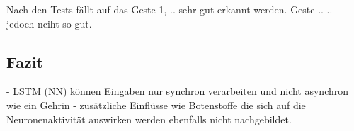 Nach den Tests fällt auf das Geste 1, .. sehr gut erkannt werden. Geste .. ..
jedoch nciht so gut.
\subsection{Fazit}
- LSTM (NN) können Eingaben nur synchron verarbeiten und nicht asynchron wie ein
Gehrin
- zusätzliche Einflüsse wie Botenstoffe die sich auf die Neuronenaktivität
auswirken werden ebenfalls nicht nachgebildet. 

\nocite{schaul2010,GERS2001,WIKI2013,Schmidhuber2013,LSTM1,Nerbonne1}
